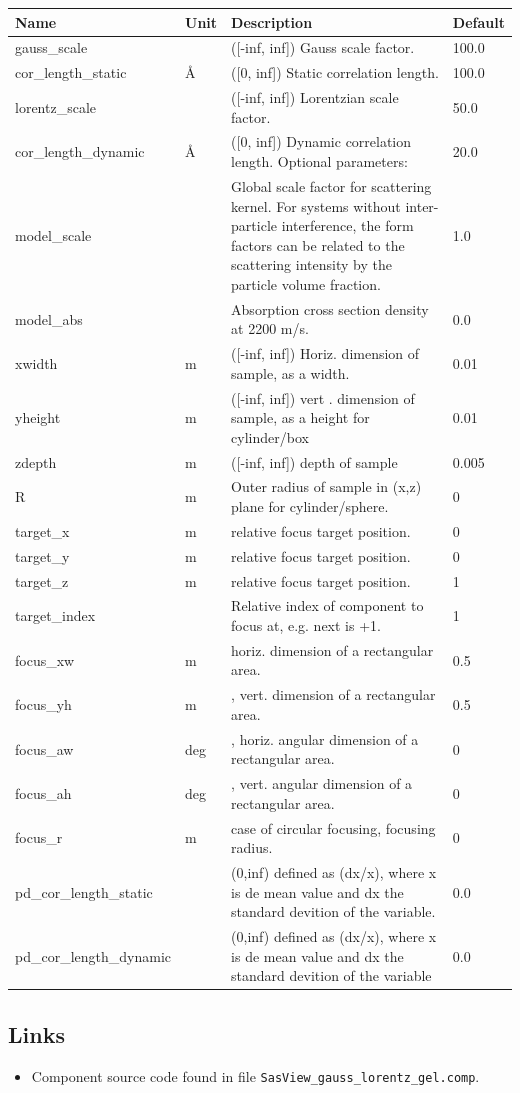 \begin{longtable}{p{}p{}p{}p{}}
\toprule
\textbf{Name} & \textbf{Unit} & \textbf{Description} & \textbf{Default} \\
\midrule
\endhead
gauss\_scale &  & ([-inf, inf]) Gauss scale factor. & 100.0 \\
cor\_length\_static & \AA{} & ([0, inf]) Static correlation length. & 100.0 \\
lorentz\_scale &  & ([-inf, inf]) Lorentzian scale factor. & 50.0 \\
cor\_length\_dynamic & \AA{} & ([0, inf]) Dynamic correlation length. Optional parameters: & 20.0 \\
model\_scale &   & Global scale factor for scattering kernel. For systems without inter-particle interference, the form factors can be related to the scattering intensity by the particle volume fraction. & 1.0 \\
model\_abs &   & Absorption cross section density at 2200 m/s. & 0.0 \\
xwidth & m & ([-inf, inf]) Horiz. dimension of sample, as a width. & 0.01 \\
yheight & m & ([-inf, inf]) vert . dimension of sample, as a height for cylinder/box & 0.01 \\
zdepth & m & ([-inf, inf]) depth of sample & 0.005 \\
R & m & Outer radius of sample in (x,z) plane for cylinder/sphere. & 0 \\
target\_x & m & relative focus target position. & 0 \\
target\_y & m & relative focus target position. & 0 \\
target\_z & m & relative focus target position. & 1 \\
target\_index &   & Relative index of component to focus at, e.g. next is +1. & 1 \\
focus\_xw & m & horiz. dimension of a rectangular area. & 0.5 \\
focus\_yh & m & , vert. dimension of a rectangular area. & 0.5 \\
focus\_aw & deg & , horiz. angular dimension of a rectangular area. & 0 \\
focus\_ah & deg & , vert. angular dimension of a rectangular area. & 0 \\
focus\_r & m & case of circular focusing, focusing radius. & 0 \\
pd\_cor\_length\_static &  & (0,inf) defined as (dx/x), where x is de mean value and dx the standard devition of the variable. & 0.0 \\
pd\_cor\_length\_dynamic &  & (0,inf) defined as (dx/x), where x is de mean value and dx the standard devition of the variable & 0.0 \\
\bottomrule
\end{longtable}

\subsection*{Links}
\begin{itemize}
  \item Component source code found in file \texttt{SasView\_gauss\_lorentz\_gel.comp}.
\end{itemize}
